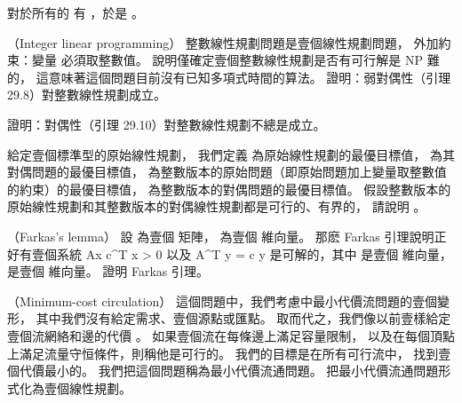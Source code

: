 \startigBase[continue]\startitem
對於所有的  有 ，於是 。
\stopitem\stopigBase
\stopitem\stopigBase

\startANSWER
{}
\stopANSWER

\stopPROBLEM

\startPROBLEM
（Integer linear programming）
{\EMP 整數線性規劃問題}是壹個線性規劃問題，
外加約束：變量  必須取整數值。
 說明僅確定壹個整數線性規劃是否有可行解是 NP 難的，
這意味著這個問題目前沒有已知多項式時間的算法。
\startigBase[a]\startitem
證明：弱對偶性（引理 29.8）對整數線性規劃成立。
\stopitem\stopigBase

\startANSWER
{}
\stopANSWER

\startigBase[continue]\startitem
證明：對偶性（引理 29.10）對整數線性規劃不總是成立。
\stopitem\stopigBase

\startANSWER
{}
\stopANSWER

\startigBase[continue]\startitem
給定壹個標準型的原始線性規劃，
我們定義  為原始線性規劃的最優目標值，
  為其對偶問題的最優目標值，
  為整數版本的原始問題（即原始問題加上變量取整數值的約束）的最優目標值，
  為整數版本的對偶問題的最優目標值。
假設整數版本的原始線性規劃和其整數版本的對偶線性規劃都是可行的、有界的，
請說明 。
\stopitem\stopigBase

\startANSWER
{}
\stopANSWER

\stopPROBLEM

\startPROBLEM
（Farkas’s lemma）
設  為壹個  矩陣，
  為壹個  維向量。
那麽 Farkas 引理說明正好有壹個系統
\startformula\startmathalignment
\NC Ax \NC {} \NR
\NC c^T x \NC > 0 \NR
\stopmathalignment\stopformula
以及
\startformula\startmathalignment
\NC A^T y \NC = c \NR
\NC     y \NC {} \NR
\stopmathalignment\stopformula
是可解的，其中  是壹個  維向量，
  是壹個  維向量。
證明 Farkas 引理。
\stopPROBLEM

\startANSWER
{}
\stopANSWER

\startPROBLEM
（Minimum-cost circulation）
這個問題中，我們考慮 中最小代價流問題的壹個變形，
其中我們沒有給定需求、壹個源點或匯點。
取而代之，我們像以前壹樣給定壹個流網絡和邊的代價 。
如果壹個流在每條邊上滿足容量限制，
以及在每個頂點上滿足流量守恒條件，則稱他是可行的。
我們的目標是在所有可行流中，
找到壹個代價最小的。
我們把這個問題稱為{\EMP 最小代價流通問題}。
\startigBase[a]\startitem
把最小代價流通問題形式化為壹個線性規劃。
\stopitem\stopigBase

